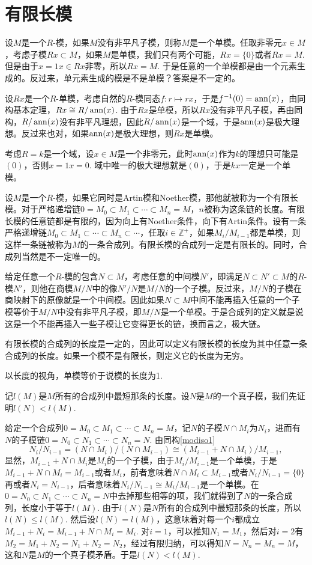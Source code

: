 \section{有限长模}

\para 设$M$是一个$R$-模，如果$M$没有非平凡子模，则称$M$是一个单模。任取非零元$x\in M$，考虑子模$Rx\subset M$，如果$M$是单模，我们只有两个可能，$Rx=\{0\}$或者$Rx=M$. 但是由于$x=1x\in Rx$非零，所以$Rx=M$. 于是任意的一个单模都是由一个元素生成的。反过来，单元素生成的模是不是单模？答案是不一定的。

设$Rx$是一个$R$-单模，考虑自然的$R$-模同态$f:r\mapsto rx$，于是$f^{-1}(0)=\operatorname{ann}(x)$，由同构基本定理，$Rx\cong R/\operatorname{ann}(x)$. 由于$Rx$是单模，所以$Rx$没有非平凡子模，再由同构，$R/\operatorname{ann}(x)$没有非平凡理想，因此$R/\operatorname{ann}(x)$是一个域，于是$\operatorname{ann}(x)$是极大理想。反过来也对，如果$\operatorname{ann}(x)$是极大理想，则$Rx$是单模。

考虑$R=k$是一个域，设$x\in M$是一个非零元，此时$\operatorname{ann}(x)$作为$k$的理想只可能是$(0)$，否则$x=1x=0$. 域中唯一的极大理想就是$(0)$，于是$kx$一定是一个单模。

\para 设$M$是一个$R$-模，如果它同时是Artin模和Noether模，那他就被称为一个有限长模。对于严格递增链$0=M_0\subset M_1\subset \cdots\subset M_n=M$，$n$被称为这条链的长度。有限长模的任意链都是有限的，因为向上有Noether条件，向下有Artin条件。设有一条严格递增链$M_0\subset M_1\subset \cdots\subset M_n \subset \cdots $，任取$i\in \mathbb{Z}^+$，如果$M_{i}/M_{i-1}$都是单模，则这样一条链被称为$M$的一条合成列。有限长模的合成列一定是有限长的。同时，合成列当然是不一定唯一的。

给定任意一个$R$-模的包含$N\subset M$，考虑任意的中间模$N'$，即满足$N\subset N'\subset M$的$R$-模$N'$，则他在商模$M/N$中的像$N'/N$是$M/N$的一个子模。反过来，$M/N$的子模在商映射下的原像就是一个中间模。因此如果$N\subset M$中间不能再插入任意的一个子模等价于$M/N$中没有非平凡子模，即$M/N$是一个单模。于是合成列的定义就是说这是一个不能再插入一些子模让它变得更长的链，换而言之，极大链。

\pro 有限长模的合成列的长度是一定的，因此可以定义有限长模的长度为其中任意一条合成列的长度。如果一个模不是有限长，则定义它的长度为无穷。

以长度的视角，单模等价于说模的长度为1.

\proof
	记$l(M)$是$M$所有的合成列中最短那条的长度。设$N$是$M$的一个真子模，我们先证明$l(N)<l(M)$.

	给定一个合成列$0=M_0\subset M_1\subset \cdots\subset M_n=M$，记$N$的子模$N\cap M_i$为$N_i$，进而有$N$的子模链$0=N_0\subset N_1\subset \cdots\subset N_n=N$. 由同构\eqref{modiso1}
	\[
	N_i/N_{i-1}=(N\cap M_i)/(N\cap M_{i-1})\cong (M_{i-1}+N\cap M_i)/M_{i-1},
	\]
	显然，$M_{i-1}+N\cap M_i$是$M_i$的一个子模，由于$M_i/M_{i-1}$是一个单模，于是$M_{i-1}+N\cap M_i=M_{i-1}$或者$M_i$，前者意味着$N\cap M_i\subset M_{i-1}$或者$N_i/N_{i-1}=\{0\}$再或者$N_i=N_{i-1}$，后者意味着$N_i/N_{i-1}\cong M_i/M_{i-1}$是一个单模。在$0=N_0\subset N_1\subset \cdots\subset N_n=N$中去掉那些相等的项，我们就得到了$N$的一条合成列，长度小于等于$l(M)$. 由于$l(N)$是$N$所有的合成列中最短那条的长度，所以$l(N)\leq l(M)$. 然后设$l(N)=l(M)$，这意味着对每一个$i$都成立$M_{i-1}+N_i=M_{i-1}+N\cap M_i=M_i$. 对$i=1$，可以推知$N_1=M_1$，然后对$i=2$有$M_2=M_1+N_2=N_1+N_2=N_2$，经过有限归纳，可以得知$N=N_n=M_n=M$，这和$N$是$M$的一个真子模矛盾。于是$l(N)<l(M)$.

